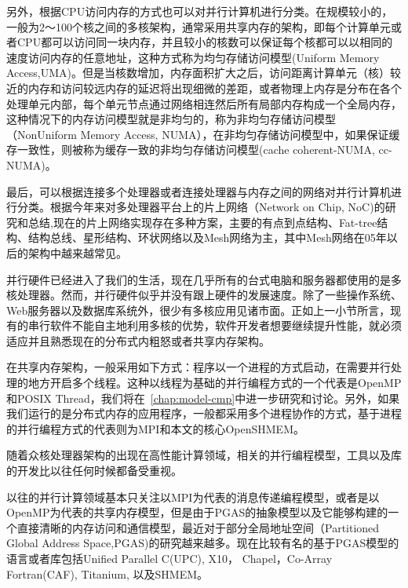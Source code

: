 另外，根据CPU访问内存的方式也可以对并行计算机进行分类。在规模较小的，一般为2～100个核之间的多核架构，通常采用共享内存的架构，即每个计算单元或者CPU都可以访问同一块内存，并且较小的核数可以保证每个核都可以以相同的速度访问内存的任意地址，这种方式称为均匀存储访问模型(Uniform Memory Access,UMA)。但是当核数增加，内存面积扩大之后，访问距离计算单元（核）较近的内存和访问较远内存的延迟将出现细微的差距，或者物理上内存是分布在各个处理单元内部，每个单元节点通过网络相连然后所有局部内存构成一个全局内存，这种情况下的内存访问模型就是非均匀的，称为非均匀存储访问模型（NonUniform Memory Access, NUMA），在非均匀存储访问模型中，如果保证缓存一致性，则被称为缓存一致的非均匀存储访问模型(cache coherent-NUMA, cc-NUMA)。

最后，可以根据连接多个处理器或者连接处理器与内存之间的网络对并行计算机进行分类。根据今年来对多处理器平台上的片上网络（Network on Chip, NoC)的研究和总结\cite{jour:NoC},现在的片上网络实现存在多种方案，主要的有点到点结构、Fat-tree结构、结构总线、星形结构、环状网络以及Mesh网络为主，其中Mesh网络在05年以后的架构中越来越常见。

并行硬件已经进入了我们的生活，现在几乎所有的台式电脑和服务器都使用的是多核处理器。然而，并行硬件似乎并没有跟上硬件的发展速度。除了一些操作系统、Web服务器以及数据库系统外，很少有多核应用见诸市面。正如上一小节所言，现有的串行软件不能自主地利用多核的优势，软件开发者想要继续提升性能，就必须适应并且熟悉现在的分布式内粗怒或者共享内存架构。

在共享内存架构，一般采用如下方式：程序以一个进程的方式启动，在需要并行处理的地方开启多个线程。这种以线程为基础的并行编程方式的一个代表是OpenMP和POSIX Thread，我们将在~\ref{chap:model-cmp}中进一步研究和讨论。另外，如果我们运行的是分布式内存的应用程序，一般都采用多个进程协作的方式，基于进程的并行编程方式的代表则为MPI和本文的核心OpenSHMEM。

随着众核处理器架构的出现在高性能计算领域，相关的并行编程模型，工具以及库的开发比以往任何时候都备受重视。

以往的并行计算领域基本只关注以MPI为代表的消息传递编程模型，或者是以OpenMP为代表的共享内存模型，但是由于PGAS的抽象模型以及它能够构建的一个直接清晰的内存访问和通信模型，最近对于部分全局地址空间（Partitioned Global Address Space,PGAS)的研究越来越多。现在比较有名的基于PGAS模型的语言或者库包括Unified Parallel C(UPC), X10， Chapel，Co-Array Fortran(CAF), Titanium, 以及SHMEM\cite{site:shmem_api}。

